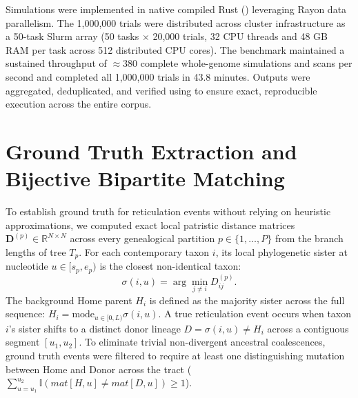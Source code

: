 Simulations were implemented in native compiled Rust () leveraging Rayon data parallelism.
The 1,000,000 trials were distributed across cluster infrastructure as a 50-task Slurm array (50 tasks $\times$ 20,000 trials, 32 CPU threads and 48 GB RAM per task across 512 distributed CPU cores).
The benchmark maintained a sustained throughput of $\approx 380$ complete whole-genome simulations and scans per second and completed all 1,000,000 trials in 43.8 minutes.
Outputs were aggregated, deduplicated, and verified using  to ensure exact, reproducible execution across the entire corpus.

\section{Ground Truth Extraction and Bijective Bipartite Matching}
\label{supp:bipartite_matching_full}

To establish ground truth for reticulation events without relying on heuristic approximations, we computed exact local patristic distance matrices $\mathbf{D}^{(p)} \in \mathbb{R}^{N \times N}$ across every genealogical partition $p \in \{1, \dots, P\}$ from the branch lengths of tree $T_p$.
For each contemporary taxon $i$, its local phylogenetic sister at nucleotide $u \in [s_p, e_p)$ is the closest non-identical taxon:
\begin{equation}
\sigma(i, u) = \arg\min_{j \ne i} D_{ij}^{(p)}.
\end{equation}
The background Home parent $H_i$ is defined as the majority sister across the full sequence: $H_i = \text{mode}_{u \in [0, L)} \sigma(i, u)$.
A true reticulation event occurs when taxon $i$'s sister shifts to a distinct donor lineage $D = \sigma(i, u) \ne H_i$ across a contiguous segment $[u_1, u_2]$.
To eliminate trivial non-divergent ancestral coalescences, ground truth events were filtered to require at least one distinguishing mutation between Home and Donor across the tract ($\sum_{u=u_1}^{u_2} \mathbb{I}(mat[H, u] \ne mat[D, u]) \ge 1$).


